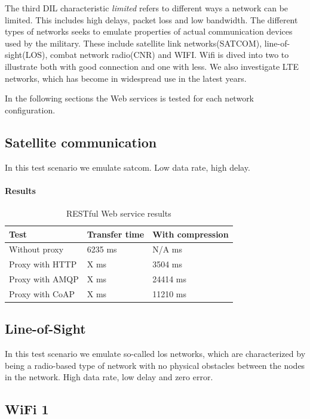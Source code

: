 The third DIL characteristic \textit{limited} refers to different ways a
network can be limited. This includes high delays, packet loss and low
bandwidth. The different types of networks seeks to emulate properties of
actual communication devices used by the military. These include satellite
link networks(SATCOM), line-of-sight(LOS), combat network radio(CNR) and WIFI.
Wifi is dived into two to illustrate both with good connection and one with
less. We also investigate LTE networks, which has become in widespread use in
the latest years.

In the following sections the Web services is tested for each network
configuration. 


\subsection{Satellite communication}

In this test scenario we emulate \gls{satcom}. Low data rate, high delay.

\paragraph{Results}

\begin{table}[h!]
\begin{tabular}{| l | l | l |}
\hline
  \textbf{Test} & \textbf{Transfer time} & \textbf{With compression}\\ \hline
  Without proxy & 6235 ms & N/A ms \\ \hline
  Proxy with HTTP & X ms & 3504 ms \\ \hline
  Proxy with AMQP & X ms & 24414 ms \\ \hline
  Proxy with CoAP & X ms & 11210 ms \\ \hline
\end{tabular}
\caption{RESTful Web service results}
\end{table}

\subsection{Line-of-Sight}

In this test scenario we emulate so-called \gls{los} networks, which are
characterized by being a radio-based type of network with no physical obstacles
between the nodes in the network. High data rate, low delay and zero error.

\subsection{WiFi 1}

